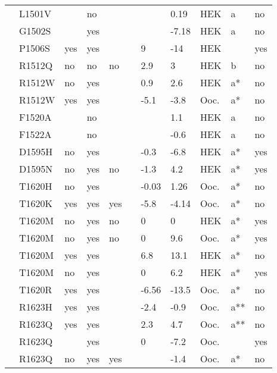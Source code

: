\begin{tiny}
\begin{longtable}{p{4cm}|l|llll|ll|lll}
\citet{Hoshi2014MutationDB} & L1501V &  & no &  &  &  & 0.19 & HEK & a & no \\
\citet{Hoshi2014MutationDB} & G1502S &  & yes &  &  &  & -7.18 & HEK & a & no \\
\citet{Saber2015MutationDB} & P1506S & yes & yes &  &  & 9 & -14 & HEK &  & yes \\
\citet{Beyder2014MutationDB} & R1512Q & no & no & no &  & 2.9 & 3 & HEK & b & no \\
\citet{Deschenes2000MutationDB} & R1512W & no & yes &  &  & 0.9 & 2.6 & HEK & a* & no \\
\citet{Rook1999MutationDB} & R1512W & yes & yes &  &  & -5.1 & -3.8 & Ooc. & a* & no \\
\citet{Sarhan2009MutationDB} & F1520A &  & no &  &  &  & 1.1 & HEK & a & no \\
\citet{Sarhan2009MutationDB} & F1522A &  & no &  &  &  & -0.6 & HEK & a & no \\
\citet{Nguyen2008MutationDB} & D1595H & no & yes &  &  & -0.3 & -6.8 & HEK & a* & yes \\
\citet{Wang2002MutationDB} & D1595N & no & yes & no &  & -1.3 & 4.2 & HEK & a* & yes \\
\citet{Surber2008MutationDB} & T1620H & no & yes &  &  & -0.03 & 1.26 & Ooc. & a* & no \\
\citet{Surber2008MutationDB} & T1620K & yes & yes & yes &  & -5.8 & -4.14 & Ooc. & a* & no \\
\citet{Baroudi2000aMutationDB} & T1620M & no & yes & no &  & 0 & 0 & HEK & a* & yes \\
\citet{Baroudi2000aMutationDB} & T1620M & no & yes & no &  & 0 & 9.6 & Ooc. & a* & yes \\
\citet{Shirai2002MutationDB} & T1620M & yes & yes &  &  & 6.8 & 13.1 & HEK & a* & no \\
\citet{Wang2000MutationDB} & T1620M & no & yes &  &  & 0 & 6.2 & HEK & a* & yes \\
\citet{Surber2008MutationDB} & T1620R & yes & yes &  &  & -6.56 & -13.5 & Ooc. & a* & no \\
\citet{Chen1996MutationDB} & R1623H & yes & yes &  &  & -2.4 & -0.9 & Ooc. & a** & no \\
\citet{Chen1996MutationDB} & R1623Q & yes & yes &  &  & 2.3 & 4.7 & Ooc. & a** & no \\
\citet{Kambouris2000MutationDB} & R1623Q &  & yes &  &  & 0 & -7.2 & Ooc. &  & yes \\
\citet{Makita1998MutationDB} & R1623Q & no & yes & yes &  &  & -1.4 & Ooc. & a* & no \\

\end{longtable}
\end{tiny}
